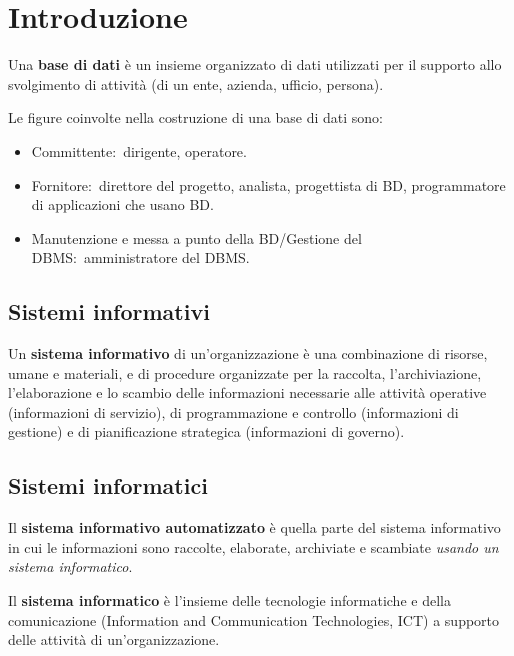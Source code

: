 \chapter{Introduzione}

Una \textbf{base di dati} è un insieme organizzato di dati utilizzati per il supporto allo svolgimento di attività (di un ente, azienda, ufficio, persona).

Le figure coinvolte nella costruzione di una base di dati sono:
\begin{itemize}
	\item Committente:\ dirigente, operatore.
	\item Fornitore:\ direttore del progetto, analista, progettista di BD, programmatore di applicazioni che usano BD.
	\item Manutenzione e messa a punto della BD/Gestione del DBMS:\ amministratore del DBMS.
\end{itemize}

\section{Sistemi informativi}

\begin{definition}
	Un \textbf{sistema informativo} di un'organizzazione è una combinazione di risorse, umane e materiali, e di procedure organizzate per la raccolta, l'archiviazione, l'elaborazione e lo scambio delle informazioni necessarie alle attività operative (informazioni di servizio), di programmazione e controllo (informazioni di gestione) e di pianificazione strategica (informazioni di governo).
\end{definition}

\section{Sistemi informatici}

Il \textbf{sistema informativo automatizzato} è quella parte del sistema informativo in cui le informazioni sono raccolte, elaborate, archiviate e scambiate \textit{usando un sistema informatico}.

Il \textbf{sistema informatico} è l'insieme delle tecnologie informatiche e della comunicazione (Information and Communication Technologies, ICT) a supporto delle attività di un'organizzazione.

